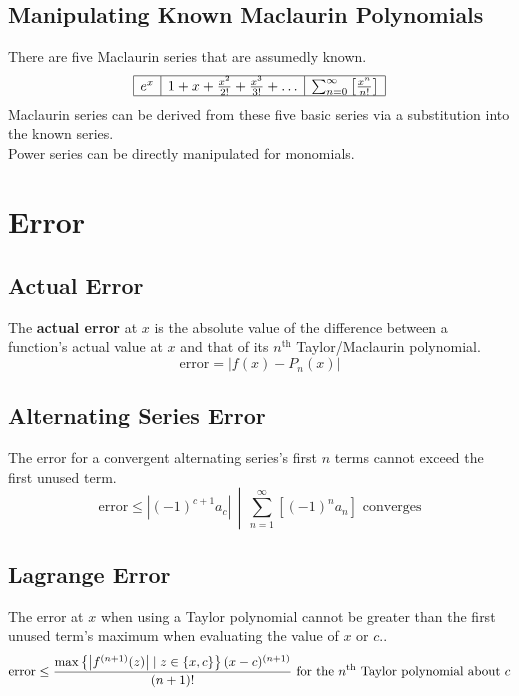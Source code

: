 \documentclass{../AP_Calculus}
\begin{document}
			\subsection*{Manipulating Known Maclaurin Polynomials}
				There are five Maclaurin series that are assumedly known.
				$$\begin{array}{|l|l|l|}\hline
				e^x & 1 + x + \frac{x^2}{2!} + \frac{x^3}{3!} + \ldots & \sum_{n = 0}^\infty\left[\frac{x^n}{n!}\right] \\\hline
				
				\end{array}$$
				Maclaurin series can be derived from these five basic series via a substitution into the known series. \\
				Power series can be directly manipulated for monomials.
		\section{Error}
			\subsection{Actual Error}
				The \textbf{actual error} at $x$ is the absolute value of the difference between a function's actual value at $x$ and that of its $n^{\mathrm{th}}$ Taylor/Maclaurin polynomial.
				\[\mathrm{error} = |f(x) - P_n(x)|\]
			\subsection{Alternating Series Error}
				The error for a convergent alternating series's first $n$ terms cannot exceed the first unused term.
				\[\left.\mathrm{error} \le \left|(-1)^{c + 1}a_c\right|\, \middle|\, \sum_{n = 1}^\infty\left[(-1)^na_n\right] \text{ converges}\right.\]
			\subsection{Lagrange Error}
				The error at $x$ when using a Taylor polynomial cannot be greater than the first unused term's maximum when evaluating the value of $x$ or $c$..
				\[\mathrm{error} \le \frac{\maximum{\left|f^{(n + 1)}(z)\right| \mid z \in \{x, c\}}(x - c)^{(n + 1)}}{(n + 1)!} \text{ for the \(n^{\mathrm{th}}\) Taylor polynomial about $c$}\]
\end{document}

